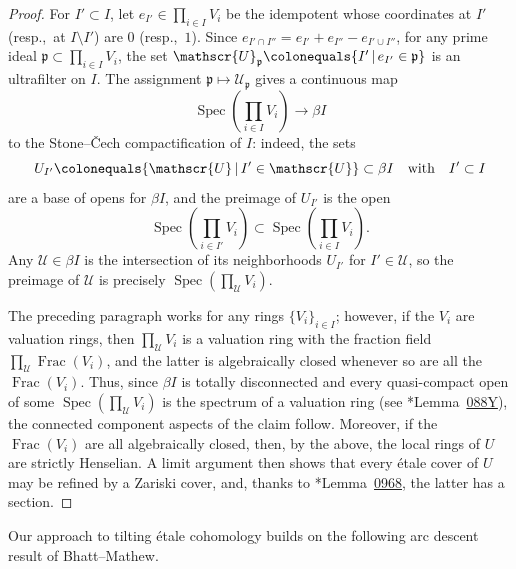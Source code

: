 \documentclass[11pt, reqno]{amsart}
\newcommand{\gB}{\beta}
\newcommand{\fp}{\mathfrak{p}}
\newcommand{\sU}{\mathscr{U}}
\DeclareMathOperator{\Frac}{Frac}		%
\DeclareMathOperator{\Spec}{Spec}		%
\newcommand{\ce}{\colonequals}
\newcommand{\ra}{\rightarrow}
\providecommand{\f}[2]{\frac{#1}{#2}}
\providecommand{\qxq}[1]{\quad\text{#1}\quad}
\newcommand{\tst}{\textstyle}
\newcommand{\bpf}{\begin{proof}}
\newcommand{\epf}{\end{proof}}
\numberwithin{equation}{numberingbase}
\theoremstyle{thms}
\theoremstyle{claims}
\theoremstyle{defs}
\theoremstyle{thms}
\theoremstyle{defs}
\theoremstyle{subsection-tweak}
\theoremstyle{subsection-tweak}
\begin{document}
\bpf
For $I' \subset I$, let $e_{I'} \in \prod_{i \in I} V_i$ be the idempotent whose coordinates at $I'$ (resp.,~at $I \setminus I'$) are $0$ (resp.,~$1$). Since $e_{I' \cap I''} = e_{I'} + e_{I''} - e_{I' \cup I''}$, for any prime ideal $\fp \subset \prod_{i \in I} V_i$, the set $\sU_\fp \ce \{ I' \, \vert\, e_{I'} \in \fp\}$ is an ultrafilter on $I$. The assignment $\fp \mapsto \sU_\fp$ gives a continuous map 
\[
\tst\Spec(\prod_{i \in I} V_i) \ra \gB I
\] 
to the Stone--\v{C}ech compactification of $I$: indeed, the sets 
\[
U_{I'} \ce \{ \sU \, \vert \, I' \in \sU\} \subset \gB I \qxq{with} I' \subset I
\]
are a base of opens for $\gB I$, and the preimage of $U_{I'}$ is the open 
\[
\tst\Spec(\prod_{i \in I'} V_i) \subset \Spec(\prod_{i \in I} V_i).
\] %
Any $\sU \in \gB I$ is the intersection of its neighborhoods $U_{I'}$ for $I' \in \sU$, so the preimage of $\sU$ is precisely $\Spec(\prod_{\sU} V_i)$. 

The preceding paragraph works for any rings $\{V_i\}_{i \in I}$; however, if the $V_i$ are valuation rings, then $\prod_{\sU} V_i$ is a valuation ring with the fraction field $\prod_{\sU} \Frac(V_i)$, and the latter is algebraically closed whenever so are all the $\Frac(V_i)$. Thus, since $\gB I$ is totally disconnected and every quasi-compact open of some $\Spec(\prod_{\sU} V_i)$ is the spectrum of a valuation ring (see \cite{SP}*{Lemma~\href{https://stacks.math.columbia.edu/tag/088Y}{088Y}}), the connected component aspects of the claim follow. Moreover, if the $\Frac(V_i)$ are all algebraically closed, then, by the above, the local rings of $U$ are strictly Henselian. A limit argument then shows that every \'{e}tale cover of $U$ may be refined by a Zariski cover, and, thanks to \cite{SP}*{Lemma~\href{https://stacks.math.columbia.edu/tag/0968}{0968}}, the latter has a section. 
\epf



Our approach to tilting \'{e}tale cohomology builds on the following arc descent result of Bhatt--Mathew. %
\end{document}
